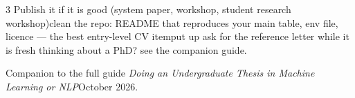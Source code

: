 \documentclass[10pt,a4paper]{article}
\begin{document}
\begin{multicols}{3}
Publish it if it is good (system paper, workshop, student research
workshop)\dt clean the repo: README that reproduces your main table, env file,
licence --- the best entry-level CV item\dt put up
\dt ask for the reference letter while it is fresh\dt
thinking about a PhD? see the companion guide.

\vspace{2pt}
{\color{mutegray}Companion to the full guide \emph{Doing an Undergraduate
Thesis in Machine Learning or NLP}\dt October 2026.}

\end{multicols}
\end{document}
